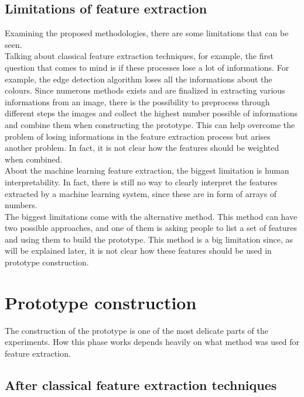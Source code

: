 \documentclass[conference]{IEEEtran}
\begin{document}
		\subsection{Limitations of feature extraction}
		
			\noindent Examining the proposed methodologies, there are some limitations that can be seen.\\
			Talking about classical feature extraction techniques, for example, the first question that comes to mind is if these processes lose a lot of informations. For example, the edge detection algorithm loses all 
			the informations about the colours. Since numerous methods exists and are finalized in extracting various informations from an image, there is the possibility to preprocess through different steps the 
			images and collect the highest number possible of informations and combine them when constructing the prototype. This can help overcome the problem of losing informations in the feature extraction process but 
			arises another problem. In fact, it is not clear how the features should be weighted when combined. \\
			About the machine learning feature extraction, the biggest limitation is human interpretability. In fact, there is still no way to clearly interpret the features extracted by a machine learning system, since 
			these are in form of arrays of numbers. \\
			The biggest limitations come with the alternative method. This method can have two possible approaches, and one of them is asking people to list a set of features and using them to build the prototype. This 
			method is a big limitation since, as will be explained later, it is not clear how these features should be used in prototype construction. 

	\section{Prototype construction}

		\noindent The construction of the prototype is one of the most delicate parts of the experiments. How this phase works depends heavily on what method was used for feature extraction. 
		
		\subsection{After classical feature extraction techniques\label{sec:cfet}}
		
\end{document}

